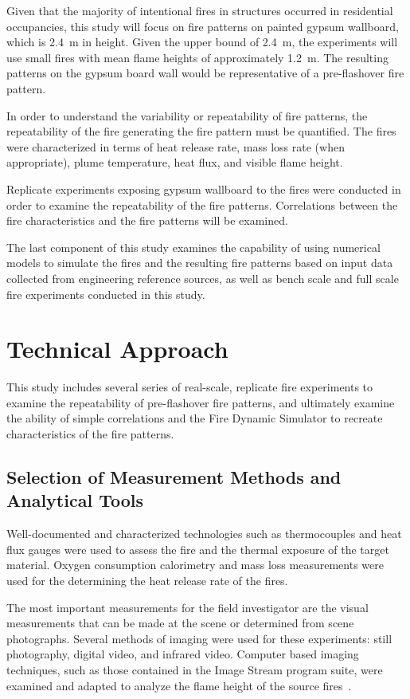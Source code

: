 \documentclass[twoside]{uocthesis}
\begin{document}
Given that the majority of intentional fires in structures occurred in residential occupancies, this study will focus on fire patterns on painted gypsum wallboard, which is 2.4~m in height.  Given the upper bound of 2.4~m, the experiments will use small fires with mean flame heights of approximately 1.2~m.  The resulting patterns on the gypsum board wall would be representative of a pre-flashover fire pattern.

In order to understand the variability or repeatability of fire patterns, the repeatability of the fire generating the fire pattern must be quantified.  The fires were characterized in terms of heat release rate, mass loss rate (when appropriate), plume temperature, heat flux, and visible flame height.

Replicate experiments exposing gypsum wallboard to the fires were conducted in order to examine the repeatability of the fire patterns.  Correlations between the fire characteristics and the fire patterns will be examined.

The last component of this study examines the capability of using numerical models to simulate the fires and the resulting fire patterns based on input data collected from engineering reference sources, as well as  bench scale and full scale fire experiments conducted in this study.

\chapter{Technical Approach}
\label{chapter:Technical Approach}

This study includes several series of real-scale, replicate fire experiments to examine the repeatability of pre-flashover fire patterns, and ultimately examine the ability of simple correlations and the Fire Dynamic Simulator to recreate characteristics of the fire patterns.

\section{Selection of Measurement Methods and Analytical Tools}

Well-documented and characterized technologies such as thermocouples and heat flux gauges were used to assess the fire and the thermal exposure of the target material.  Oxygen consumption calorimetry and mass loss measurements were used for the determining the heat release rate of the fires.

The most important measurements for the field investigator are the visual measurements that can be made at the scene or determined from scene photographs. Several methods of imaging were used for these experiments: still photography, digital video, and infrared video.  Computer based imaging techniques, such as those contained in the Image Stream program suite, were examined and adapted to analyze the flame height of the source fires~\cite{Nokes:2011}.
\end{document}
